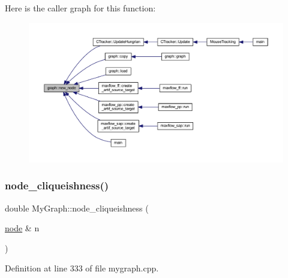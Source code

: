 Here is the caller graph for this function\+:
\nopagebreak
\begin{figure}[H]
\begin{center}
\leavevmode
\includegraphics[width=350pt]{classgraph_ab9505335c20558319b6cce25aed23524_icgraph}
\end{center}
\end{figure}
\mbox{\label{class_my_graph_a513bec2f1949a01d517dd57cc9c30233}} 
\subsubsection{\texorpdfstring{node\+\_\+cliqueishness()}{node\_cliqueishness()}}
{\footnotesize\ttfamily double My\+Graph\+::node\+\_\+cliqueishness (\begin{DoxyParamCaption}\item[{\mbox{\hyperlink{classnode}{node}} \&}]{n }\end{DoxyParamCaption})\hspace{0.3cm}{\ttfamily [inherited]}}



Definition at line 333 of file mygraph.\+cpp.


